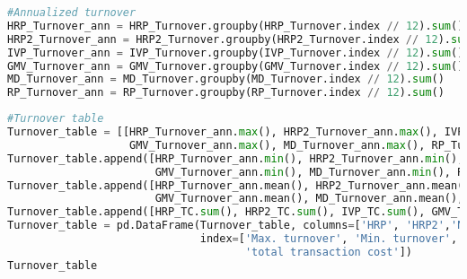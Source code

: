 \begin{lstlisting}[language=Python]
#Annualized turnover
HRP_Turnover_ann = HRP_Turnover.groupby(HRP_Turnover.index // 12).sum()
HRP2_Turnover_ann = HRP2_Turnover.groupby(HRP2_Turnover.index // 12).sum()
IVP_Turnover_ann = IVP_Turnover.groupby(IVP_Turnover.index // 12).sum()
GMV_Turnover_ann = GMV_Turnover.groupby(GMV_Turnover.index // 12).sum()
MD_Turnover_ann = MD_Turnover.groupby(MD_Turnover.index // 12).sum()
RP_Turnover_ann = RP_Turnover.groupby(RP_Turnover.index // 12).sum()
\end{lstlisting}

\begin{lstlisting}[language=Python]
#Turnover table
Turnover_table = [[HRP_Turnover_ann.max(), HRP2_Turnover_ann.max(), IVP_Turnover_ann.max(),
                   GMV_Turnover_ann.max(), MD_Turnover_ann.max(), RP_Turnover_ann.max()]]
Turnover_table.append([HRP_Turnover_ann.min(), HRP2_Turnover_ann.min(), IVP_Turnover_ann.min(),
                       GMV_Turnover_ann.min(), MD_Turnover_ann.min(), RP_Turnover_ann.min()])
Turnover_table.append([HRP_Turnover_ann.mean(), HRP2_Turnover_ann.mean(), IVP_Turnover_ann.mean(),
                       GMV_Turnover_ann.mean(), MD_Turnover_ann.mean(), RP_Turnover_ann.mean()])
Turnover_table.append([HRP_TC.sum(), HRP2_TC.sum(), IVP_TC.sum(), GMV_TC.sum(), MD_TC.sum(), RP_TC.sum()])
Turnover_table = pd.DataFrame(Turnover_table, columns=['HRP', 'HRP2','Naive RP','GMV','MD','Risk Parity'],
                              index=['Max. turnover', 'Min. turnover', 'Avg. turnover',
                                     'total transaction cost'])
Turnover_table
\end{lstlisting}

